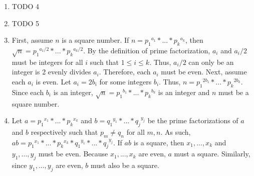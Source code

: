 \documentclass{article}
\begin{document}
\begin{enumerate}
\item TODO 4

\item TODO 5

\item First, assume $n$ is a square number.  If $n = {p_1}^{a_1} * ... * {p_k}^{a_k}$, then $\sqrt n = {p_1}^{a_1/2} * ... * {p_k}^{a_k/2}$.  By the definition of prime factorization, $a_i$ and $a_i/2$ must be integers for all $i$ such that $1 \leq i \leq k$.  Thus, $a_i/2$ can only be an integer is 2 evenly divides $a_i$.  Therefore, each $a_i$ must be even.  Next, assume each $a_i$ is even.  Let $a_i = 2b_i$ for some integers $b_i$.  Thus, $n = {p_1}^{2b_1} * ... * {p_k}^{2b_k}$.  Since each $b_i$ is an integer, $\sqrt n = {p_1}^{b_1} * ... * {p_k}^{b_k}$ is an integer and $n$ must be a square number.

\item Let $a = {p_1}^{x_1} * ... * {p_k}^{x_k}$ and $b = {q_1}^{y_1} * ... * {q_j}^{y_j}$ be the prime factorizations of $a$ and $b$ respectively such that $p_m \neq q_n$ for all $m, n$.  As such, $ab = {p_1}^{x_1} * ... * {p_k}^{x_k} * {q_1}^{y_1} * ... * {q_j}^{y_j}$.  If $ab$ is a square, then $x_1, ..., x_k$ and $y_1, ..., y_j$ must be even.  Because $x_1, ..., x_k$ are even, $a$ must a square.  Similarly, since $y_1, ..., y_j$ are even, $b$ must also be a square.

\end{enumerate}
\end{document}
